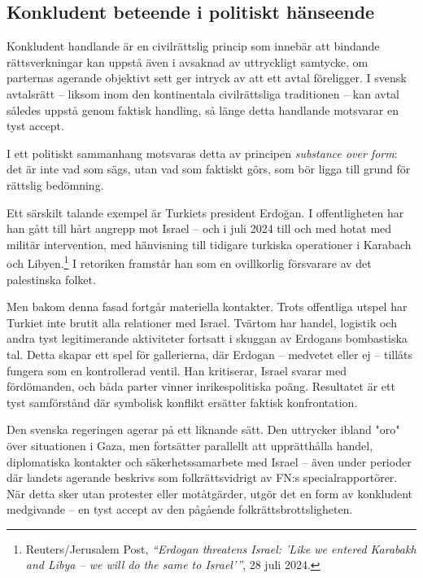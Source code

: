 

\subsection{Konkludent beteende i politiskt hänseende}

Konkludent handlande är en civilrättslig princip som innebär att bindande rättsverkningar kan uppstå även i avsaknad av uttryckligt samtycke, om parternas agerande objektivt sett ger intryck av att ett avtal föreligger. I svensk avtalsrätt – liksom inom den kontinentala civilrättsliga traditionen – kan avtal således uppstå genom faktisk handling, så länge detta handlande motsvarar en tyst accept.

I ett politiskt sammanhang motsvaras detta av principen \textit{substance over form}: det är inte vad som sägs, utan vad som faktiskt görs, som bör ligga till grund för rättslig bedömning.

Ett särskilt talande exempel är Turkiets president Erdoğan. I offentligheten har han gått till hårt angrepp mot Israel – och i juli 2024 till och med hotat med militär intervention, med hänvisning till tidigare turkiska operationer i Karabach och Libyen.\footnote{Reuters/Jerusalem Post, \textit{“Erdogan threatens Israel: 'Like we entered Karabakh and Libya – we will do the same to Israel'”}, 28 juli 2024.} I retoriken framstår han som en ovillkorlig försvarare av det palestinska folket.

Men bakom denna fasad fortgår materiella kontakter. Trots offentliga utspel har Turkiet inte brutit alla relationer med Israel. Tvärtom har handel, logistik och andra tyst legitimerande aktiviteter fortsatt i skuggan av Erdogans bombastiska tal. Detta skapar ett spel för gallerierna, där Erdogan – medvetet eller ej – tillåts fungera som en kontrollerad ventil. Han kritiserar, Israel svarar med fördömanden, och båda parter vinner inrikespolitiska poäng. Resultatet är ett tyst samförstånd där symbolisk konflikt ersätter faktisk konfrontation.

Den svenska regeringen agerar på ett liknande sätt. Den uttrycker ibland "oro" över situationen i Gaza, men fortsätter parallellt att upprätthålla handel, diplomatiska kontakter och säkerhetssamarbete med Israel – även under perioder där landets agerande beskrivs som folkrättsvidrigt av FN:s specialrapportörer. När detta sker utan protester eller motåtgärder, utgör det en form av konkludent medgivande – en tyst accept av den pågående folkrättsbrottsligheten.

